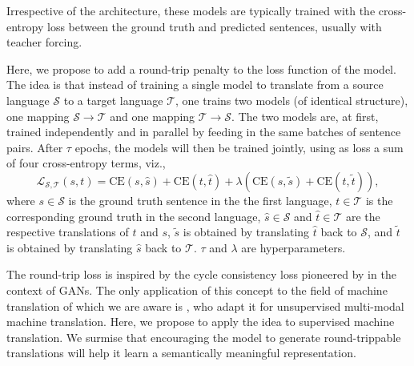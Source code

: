 \documentclass[11pt,a4paper]{article}
\begin{document}
Irrespective of the architecture, these models are typically trained with the cross-entropy loss between the ground truth and predicted sentences, usually with teacher forcing.

Here, we propose to add a round-trip penalty to the loss function of the model. The idea is that instead of training a single model to translate from a source language $\mathcal{S}$ to a target language $\mathcal{T}$, one trains two models (of identical structure), one mapping $\mathcal{S} \xrightarrow{} \mathcal{T}$ and one mapping $\mathcal{T}\xrightarrow{} \mathcal{S}$. The two models are, at first, trained independently and in parallel by feeding in the same batches of sentence pairs. After $\tau$ epochs, the models will then be trained jointly, using as loss a sum of four cross-entropy terms, viz.,
\begin{equation*}
    \mathcal{L}_{\mathcal{S}, \mathcal{T}} (s,t) = \text{CE}(s, \hat{s}) + \text{CE}(t, \hat{t}) + \lambda \left( \text{CE}(s, \tilde{s}) + \text{CE}(t, \tilde{t}) \right),
\end{equation*}
where $s\in\mathcal{S}$ is the ground truth sentence in the the first language, $t\in\mathcal{T}$ is the corresponding ground truth in the second language, $\hat{s}\in\mathcal{S}$ and $\hat{t}\in\mathcal{T}$ are the respective translations of $t$ and $s$, $\tilde{s}$ is obtained by translating $\hat{t}$ back to $\mathcal{S}$, and $\tilde{t}$ is obtained by translating $\hat{s}$ back to $\mathcal{T}$. $\tau$ and $\lambda$ are hyperparameters. 

The round-trip loss is inspired by the cycle consistency loss pioneered by \citet{CycleGAN2017} in the context of GANs. The only application of this concept to the field of machine translation of which we are aware is \citet{su:2018}, who adapt it for unsupervised multi-modal machine translation. Here, we propose to apply the idea to supervised machine translation. We surmise that encouraging the model to generate round-trippable translations will help it learn a semantically meaningful representation.

\end{document}
